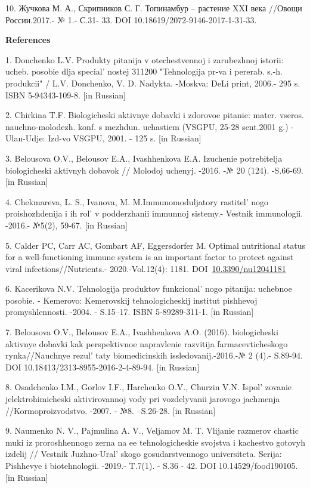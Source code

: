 10. Жучкова М. А., Скрипников С. Г. Топинамбур -- растение XXI века
//Овощи России.2017.- № 1.- С.31- 33. DOI
10.18619/2072-9146-2017-1-31-33.

{\bfseries References}

1. Donchenko L.V. Produkty pitanija v otechestvennoj i zarubezhnoj
istorii: ucheb. posobie dlja special' nostej 311200
"Tehnologija pr-va i pererab. s.-h. produkcii" / L.V. Donchenko, V. D.
Nadykta. -Moskva: DeLi print, 2006.- 295 s. ISBN 5-94343-109-8. {[}in
Russian{]}

2. Chirkina T.F. Biologicheski aktivnye dobavki i zdorovoe pitanie:
mater. vseros. nauchno-molodezh. konf. s mezhdun. uchastiem (VSGPU,
25-28 sent.2001 g.) - Ulan-Udje: Izd-vo VSGPU, 2001. - 125 s. {[}in
Russian{]}

3. Belousova O.V., Belousov E.A., Ivashhenkova E.A. Izuchenie
potrebitelja biologicheski aktivnyh dobavok // Molodoj uchenyj. -2016.
-№ 20 (124). -S.66-69. {[}in Russian{]}

4. Chekmareva, L. S., Ivanova, M. M.Immunomoduljatory
rastitel' nogo proishozhdenija i ih rol'{}
v podderzhanii immunnoj sistemy.- Vestnik immunologii. -2016.- №5(2),
59-67. {[}in Russian{]}

5. Calder PC, Carr AC, Gombart AF, Eggersdorfer M. Optimal nutritional
status for a well-functioning immune system is an important factor to
protect against viral infections//Nutrients.- 2020.-Vol.12(4): 1181.
DOI~\href{https://doi.org/10.3390/nu12041181}{10.3390/nu12041181}

6. Kacerikova N.V. Tehnologija produktov funkcional' nogo
pitanija: uchebnoe posobie. - Kemerovo: Kemerovskij tehnologicheskij
institut pishhevoj promyshlennosti. -2004. - S.15--17. ISBN
5-89289-311-1. {[}in Russian{]}

7. Belousova O.V., Belousov E.A., Ivashhenkova A.O. (2016). biologicheski
aktivnye dobavki kak perspektivnoe napravlenie razvitija
farmacevticheskogo rynka//Nauchnye rezul' taty
biomedicinskih issledovanij.-2016.-№ 2 (4).- S.89-94. DOI
10.18413/2313-8955-2016-2-4-89-94. {[}in Russian{]}

8. Osadchenko I.M., Gorlov I.F., Harchenko O.V., Churzin V.N.
Ispol' zovanie jelektrohimicheski aktivirovannoj vody pri
vozdelyvanii jarovogo jachmenja //Kormoproizvodstvo. -2007. - №8.
--S.26-28. {[}in Russian{]}

9. Naumenko N. V., Pajmulina A. V., Veljamov M. T. Vlijanie razmerov
chastic muki iz proroshhennogo zerna na ee tehnologicheskie svojstva i
kachestvo gotovyh izdelij // Vestnik Juzhno-Ural' skogo
gosudarstvennogo universiteta. Serija: Pishhevye i biotehnologii.
-2019.- T.7(1). - S.36 - 42. DOI 10.14529/food190105. {[}in Russian{]}

